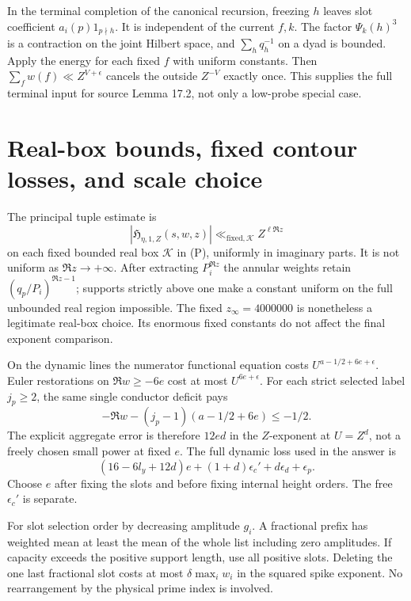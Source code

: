 \documentclass[12pt]{article}
\begin{document}
In the terminal completion of the canonical recursion,
freezing \(h\) leaves slot coefficient \(a_i(p)1_{p\nmid h}\).
It is independent of the current \(f,k\).
The factor \(\Psi_k(h)^3\) is a contraction on the joint
Hilbert space, and \(\sum_hq_h^{-1}\) on a dyad is bounded.
Apply the energy for each fixed \(f\) with uniform constants.
Then \(\sum_fw(f)\ll Z^{V+\epsilon}\) cancels the outside
\(Z^{-V}\) exactly once.  This supplies the full terminal input
for source Lemma 17.2, not only a low-probe special case.

\section{Real-box bounds, fixed contour losses, and scale choice}

The principal tuple estimate is
\[
 |\mathfrak H_{\eta,1,Z}(s,w,z)|
       \ll_{\mathrm{fixed},\mathcal K} Z^{\ell\Re z}
\]
on each fixed bounded real box \(\mathcal K\) in (P), uniformly
in imaginary parts.  It is not uniform as \(\Re z\to+\infty\).
After extracting \(P_i^{\Re z}\) the annular weights retain
\((q_p/P_i)^{\Re z-1}\); supports strictly above one make a
constant uniform on the full unbounded real region impossible.
The fixed \(z_\infty=4000000\) is nonetheless a legitimate
real-box choice.  Its enormous fixed constants do not affect
the final exponent comparison.

On the dynamic lines the numerator functional equation costs
\(U^{a-1/2+6e+\epsilon}\).  Euler restorations on
\(\Re w\ge-6e\) cost at most \(U^{6e+\epsilon}\).
For each strict selected label \(j_p\ge2\), the same single
conductor deficit pays
\[
 -\Re w-(j_p-1)(a-1/2+6e)\le-1/2 .
\]
The explicit aggregate error is therefore \(12ed\) in the
\(Z\)-exponent at \(U=Z^d\), not a freely chosen small power
at fixed \(e\).  The full dynamic loss used in the answer is
\[
 (16-6l_y+12d)e+(1+d)\epsilon_c'
                                    +d\epsilon_d+\epsilon_p .
\]
Choose \(e\) after fixing the slots and before fixing internal
height orders.  The free \(\epsilon_c'\) is separate.

For slot selection order by decreasing amplitude \(g_i\).
A fractional prefix has weighted mean at least the mean of the
whole list including zero amplitudes.  If capacity exceeds the
positive support length, use all positive slots.  Deleting the
one last fractional slot costs at most
\(\delta\max_iw_i\) in the squared spike exponent.
No rearrangement by the physical prime index is involved.
\end{document}
